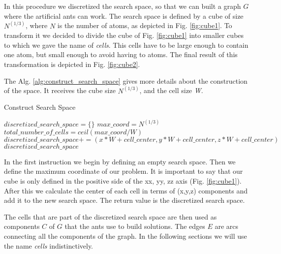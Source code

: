 	In this procedure we discretized the search space, so that we can built a graph $G$ where the artificial ants can work.
	The search space is defined by a cube of size $N^{(1/3)}$, where $N$ is the number of atoms, as depicted in Fig. \ref{fig:cube1}. To transform it we decided to divide the cube of Fig. \ref{fig:cube1} into smaller cubes to which we gave the name of \emph{cells}. This cells have to be large enough to contain one atom, but small enough to avoid having to atoms. The final result of this transformation is depicted in Fig. \ref{fig:cube2}.  
	
	
	\pagebreak
	The Alg. \ref{alg:construct_search_space} gives more details about the construction of the space. It receives the cube size $N^{(1/3)}$, and the cell size \emph{W}.
	
	\begin{algorithm}
		\caption{Construct Search Space}
		\label{alg:construct_search_space}
		\begin{algorithmic}
		\STATE $discretized\_search\_space = \{\}$
		\STATE $max\_coord = N^{(1/3)}$
		\STATE $total\_number\_of\_cells = ceil(max\_coord / W)$
					\STATE $discretized\_search\_space += (x * W + cell\_center,  y * W + cell\_center, z * W + cell\_center)$
				\ENDFOR
			\ENDFOR
		\ENDFOR
		\RETURN $discretized\_search\_space$
		\end{algorithmic}
	\end{algorithm}

	In the first instruction we begin by defining an empty search space. Then we define the maximum coordinate of our problem. It is important to say that our cube is only defined in the positive side of the xx, yy, zz axis (Fig. \ref{fig:cube1}). After this we calculate the center of each cell in terms of (x,y,z) components and add it to the new search space. 
	The return value is the discretized search space.
	
	The cells that are part of the discretized search space are then used as components $C$ of $G$ that the ants use to build solutions. The edges $E$ are arcs connecting all the components of the graph. In the following sections we will use the name \emph{cells} indistinctively.
	
